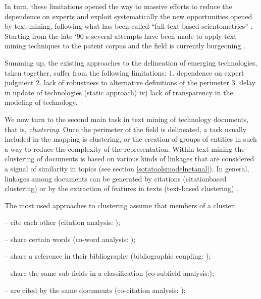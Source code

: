 \documentclass[]{book}
\begin{document}
In turn, these limitations opened the way to massive efforts to reduce
the dependence on experts and exploit systematically the new
opportunities opened by text mining, following what has been called
``full text based scientometrics'' \citep{boyack2013improving}. Starting
from the late `90 s several attempts have been made to apply text mining
techniques to the patent corpus and the field is currently burgeoning
\citep[\citet{ozcan2017patent}]{joung2017monitoring}.

Summing up, the existing approaches to the delineation of emerging
technologies, taken together, suffer from the following limitations: 1.
dependence on expert judgment 2. lack of robustness to alternative
definitions of the perimeter 3. delay in update of technologies (static
approach) iv) lack of transparency in the modeling of technology.

We now turn to the second main task in text mining of technology
documents, that is, \emph{clustering}. Once the perimeter of the field
is delineated, a task usually included in the mapping is clustering, or
the creation of groups of entities in such a way to reduce the
complexity of the representation. Within text mining the clustering of
documents is based on various kinds of linkages that are considered a
signal of similarity in topics (see section
\ref{sotatoolsmodelnetanal}). In general, linkages among documents can
be generated by citations (citationbased clustering) or by the
extraction of features in texts (text-based clustering)
\citep[\citet{wang2017clustering},\citet{jaffe1993geographic}]{leydesdorff2006measuring}.

The most used approaches to clustering assume that members of a cluster:

-- cite each other (citation analysis:
\citep[\citet{moed2006citation},\citet{verspagen2007mapping},\citet{lee2017knowledge}]{jaffe1993geographic});

-- share certain words (co-word analysis:
\citep[\citet{rip1984co},\citet{leydesdroff1989words},\citet{engelsman1994patent},\citet{van1993neural},\citet{yoon2004text}]{callon1983translations});

-- share a reference in their bibliography (bibliographic coupling:
\citep[\citet{kuusi2007anticipating}]{glanzel1996new});

-- share the same sub-fields in a classification (co-subfield
analysis:\citep{chang2009using});

-- are cited by the same documents (co-citation analysis:
\citep[\citet{small1985clustering}]{small1973co});
\end{document}
